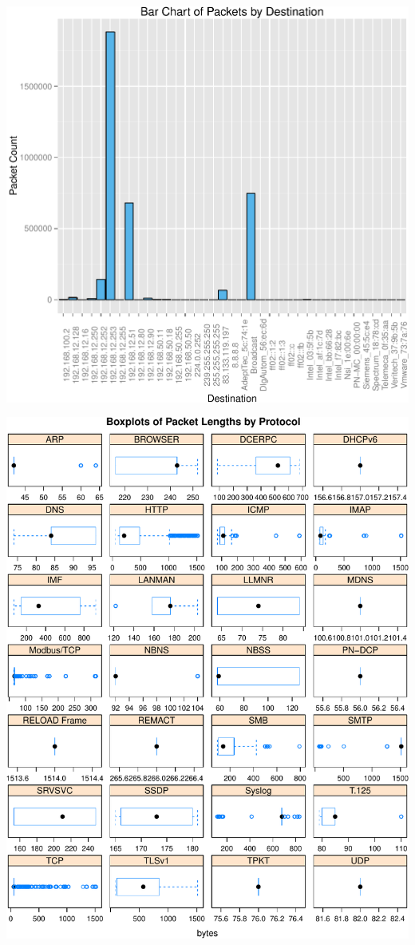 \documentclass[]{article}
\begin{document}
\includegraphics{edaReport_files/figure-latex/unnamed-chunk-9-1.pdf}

\pagebreak

\includegraphics{edaReport_files/figure-latex/unnamed-chunk-10-1.pdf}
\end{document}
